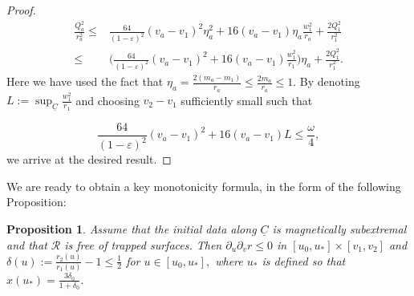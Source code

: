 \documentclass{article}[11pt]
\newcommand{\Cbar}{\underline{C}}
\newcommand{\be}{\begin{equation}}
\newcommand{\ee}{\end{equation}}
\newtheorem{proposition}{Proposition}[section]
\numberwithin{equation}{section}
\begin{document}
\begin{proof}
\begin{align}
\frac{Q_a^2}{r_a^2} \leq& \frac{64}{(1-\varepsilon)^2}(v_a-v_1)^2 \eta_a^2 +16(v_a-v_1)\eta_a \frac{w_1^2}{r_a} + \frac{2Q_1^2}{r_1^2} \\ \leq& \bigg(\frac{64}{(1-\varepsilon)^2}(v_a-v_1)^2 +16(v_a-v_1)\frac{w_1^2}{r_1}\bigg)\eta_a + \frac{2Q_1^2}{r_1^2}. 
\end{align}Here we have used the fact that $\eta_a = \frac{2(m_a-m_1)}{r_a} \leq \frac{2m_a}{r_a}\leq 1$. By denoting $L:=\sup_{\Cbar} \frac{w_1^2}{r_1}$ and choosing $v_2-v_1$ sufficiently small such that 

\be \label{conditionv}  \frac{64}{(1-\varepsilon)^2}(v_a-v_1)^2 +16(v_a-v_1)L \leq \frac{\omega}{4},       \ee we arrive at the desired result.

\end{proof}
\noindent We are ready to obtain a key monotonicity formula, in the form of the following Proposition:

\begin{proposition} \label{propmonotonicity}
Assume that the initial data along $\Cbar$ is magnetically subextremal and that $\mathcal{R}$ is free of trapped surfaces. Then $\partial_u\partial_v r \leq 0$ in $[u_0, u_*] \times [v_1,v_2]$ and $\delta(u):= \frac{r_2(u)}{r_1(u)}-1 \leq \frac{1}{2}$ for $u \in [u_0, u_*],$ where $u_*$ is defined so that $x(u_*)= \frac{3\delta_0}{1+\delta_0}.$ 
\end{proposition}
\end{document}
